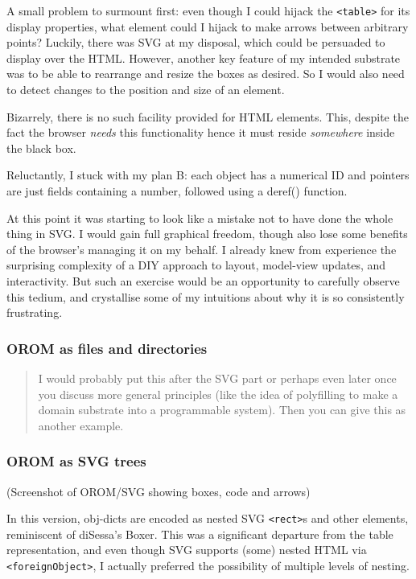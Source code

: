 \documentclass[english,submission]{programming}
\begin{document}
A small problem to surmount first: even though I could hijack the
\texttt{\textless{}table\textgreater{}} for its display properties, what
element could I hijack to make arrows between arbitrary points? Luckily,
there was SVG at my disposal, which could be persuaded to display over
the HTML. However, another key feature of my intended substrate was to
be able to rearrange and resize the boxes as desired. So I would also
need to detect changes to the position and size of an element.

Bizarrely, there is no such facility provided for HTML elements. This,
despite the fact the browser \emph{needs} this functionality hence it
must reside \emph{somewhere} inside the black box.

Reluctantly, I stuck with my plan B: each object has a numerical ID and
pointers are just fields containing a number, followed using a deref()
function.

At this point it was starting to look like a mistake not to have done
the whole thing in SVG. I would gain full graphical freedom, though also
lose some benefits of the browser's managing it on my behalf. I already
knew from experience the surprising complexity of a DIY approach to
layout, model-view updates, and interactivity. But such an exercise
would be an opportunity to carefully observe this tedium, and
crystallise some of my intuitions about why it is so consistently
frustrating.

\hypertarget{orom-as-files-and-directories}{%
\subsubsection{OROM as files and
directories}\label{orom-as-files-and-directories}}

\begin{quote}
I would probably put this after the SVG part or perhaps even later once
you discuss more general principles (like the idea of polyfilling to
make a domain substrate into a programmable system). Then you can give
this as another example.
\end{quote}

\hypertarget{orom-as-svg-trees}{%
\subsubsection{OROM as SVG trees}\label{orom-as-svg-trees}}

(Screenshot of OROM/SVG showing boxes, code and arrows)

In this version, obj-dicts are encoded as nested SVG
\texttt{\textless{}rect\textgreater{}}s and other elements, reminiscent
of diSessa's Boxer. This was a significant departure from the table
representation, and even though SVG supports (some) nested HTML via
\texttt{\textless{}foreignObject\textgreater{}}, I actually preferred
the possibility of multiple levels of nesting.
\end{document}
